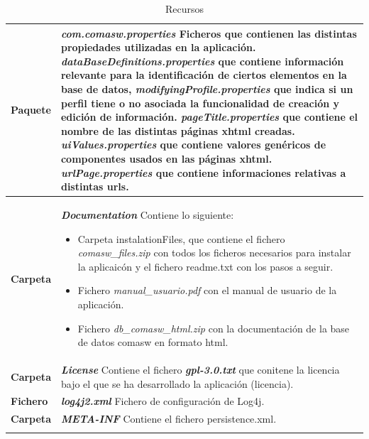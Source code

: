\begin{longtable}{m{3cm} m{12cm}}
    \caption{Recursos}
    \label{tab:recursos}\\  	
    \rowcolors{2}{white}{white}
    \textbf{Paquete} & \textit{\textbf{com.comasw.properties}} \newline
    Ficheros que contienen las distintas propiedades utilizadas en la aplicación.\newline
    \textit{dataBaseDefinitions.properties} que contiene información relevante para la identificación de ciertos elementos en la base de datos,
\textit{modifyingProfile.properties} que indica si un perfil tiene o no asociada la funcionalidad de creación y edición de información.
\textit{pageTitle.properties} que contiene el nombre de las distintas páginas \acrshort{xhtml} creadas.
\textit{uiValues.properties} que contiene valores genéricos de componentes usados en las páginas \acrshort{xhtml}.
\textit{urlPage.properties} que contiene informaciones relativas a distintas urls.
\\\hline
	\textbf{Carpeta} & \textit{\textbf{Documentation}} \newline
    Contiene lo siguiente:
    \begin{itemize}
    \item Carpeta instalationFiles, que contiene el fichero \emph{comasw\_files.zip} con todos los ficheros necesarios para instalar la aplicaicón y el fichero readme.txt con los pasos a seguir.
    \item Fichero \emph{manual\_usuario.pdf} con el manual de usuario de la aplicación.
    \item Fichero \emph{db\_comasw\_html.zip} con la documentación de la base de datos comasw en formato html.
    \end{itemize}    
    \\\hline
	\textbf{Carpeta} & \textit{\textbf{License}} \newline
	Contiene el fichero \emph{\textbf{gpl-3.0.txt}} que conitene la licencia bajo el que se ha desarrollado la aplicación (\acrshort{licencia}).
    \\\hline
	\textbf{Fichero} & \textit{\textbf{log4j2.xml}} \newline
    Fichero de configuración de Log4j.
	\\\hline
	\textbf{Carpeta} & \textit{\textbf{META-INF}} \newline
    Contiene el fichero persistence.xml.
	\\\hline
\\\hline

\end{longtable}    




